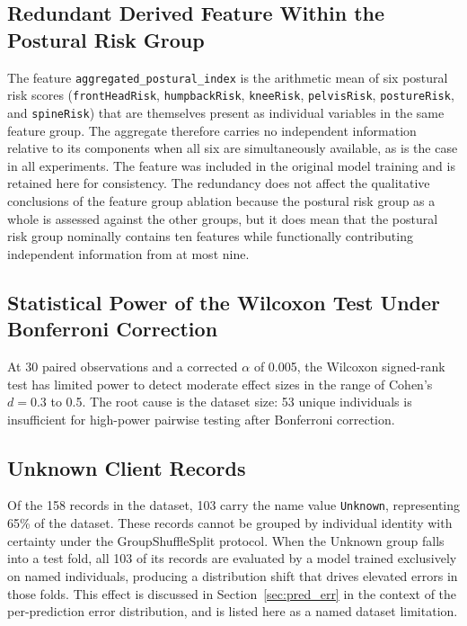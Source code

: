 \documentclass[11pt,a4paper]{report}
\begin{document}
\subsection{Redundant Derived Feature Within the Postural Risk Group}

The feature \texttt{aggregated\_postural\_index} is the arithmetic mean of six postural risk
scores (\texttt{frontHeadRisk}, \texttt{humpbackRisk}, \texttt{kneeRisk},
\texttt{pelvisRisk}, \texttt{postureRisk}, and \texttt{spineRisk}) that are themselves present
as individual variables in the same feature group. The aggregate therefore carries no independent
information relative to its components when all six are simultaneously available, as is the case
in all experiments. The feature was included in the original model training and is retained here
for consistency. The redundancy does not affect the qualitative conclusions of the feature group
ablation because the postural risk group as a whole is assessed against the other groups, but it
does mean that the postural risk group nominally contains ten features while functionally
contributing independent information from at most nine.

\subsection{Statistical Power of the Wilcoxon Test Under Bonferroni Correction}
\label{sec:power}

At 30 paired observations and a corrected $\alpha$ of 0.005, the Wilcoxon signed-rank test has
limited power to detect moderate effect sizes in the range of Cohen's $d = 0.3$ to 0.5. The root
cause is the dataset size: 53 unique individuals is insufficient for high-power pairwise testing
after Bonferroni correction.

\subsection{Unknown Client Records}
\label{sec:unknown}

Of the 158 records in the dataset, 103 carry the name value \texttt{Unknown}, representing 65\% of
the dataset. These records cannot be grouped by individual identity with certainty under the
GroupShuffleSplit protocol. When the Unknown group falls into a test fold, all 103 of its records
are evaluated by a model trained exclusively on named individuals, producing a distribution shift
that drives elevated errors in those folds. This effect is discussed in Section~\ref{sec:pred_err}
in the context of the per-prediction error distribution, and is listed here as a named dataset
limitation.
\end{document}
